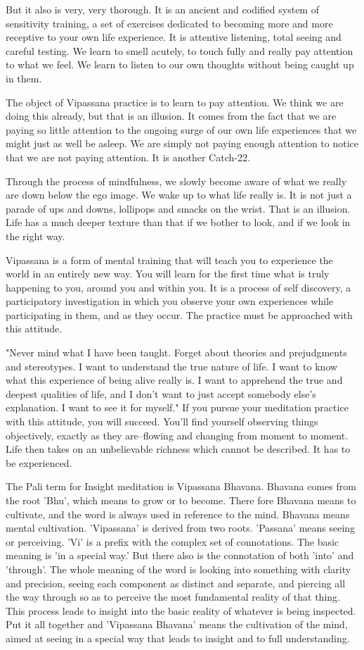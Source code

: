 But it also is very, very thorough. It is an ancient and codified system of
sensitivity training, a set of exercises dedicated to becoming more and more
receptive to your own life experience. It is attentive listening, total seeing
and careful testing. We learn to smell acutely, to touch fully and really pay
attention to what we feel.  We learn to listen to our own thoughts without
being caught up in them.

The object of Vipassana practice is to learn to pay attention. We think we are
doing this already, but that is an illusion. It comes from the fact that we are
paying so little attention to the ongoing surge of our own life experiences that
we might just as well be asleep. We are simply not paying enough attention to
notice that we are not paying attention. It is another Catch-22.

Through the process of mindfulness, we slowly become aware of what we really are
down below the ego image. We wake up to what life really is. It is not just a
parade of ups and downs, lollipops and smacks on the wrist. That is an illusion.
Life has a much deeper texture than that if we bother to look, and if we look in
the right way.

Vipassana is a form of mental training that will teach you to experience the
world in an entirely new way. You will learn for the first time what is truly
happening to you, around you and within you. It is a process of self discovery,
a participatory investigation in which you observe your own experiences while
participating in them, and as they occur. The practice must be approached with
this attitude.

"Never mind what I have been taught. Forget about theories and prejudgments and
stereotypes. I want to understand the true nature of life. I want to know what
this experience of being alive really is. I want to apprehend the true and
deepest qualities of life, and I don't want to just accept somebody else's
explanation. I want to see it for myself." If you pursue your meditation
practice with this attitude, you will succeed. You'll find yourself observing
things objectively, exactly as they are--flowing and changing from moment to
moment. Life then takes on an unbelievable richness which cannot be described.
It has to be experienced.

The Pali term for Insight meditation is Vipassana Bhavana. Bhavana comes from
the root 'Bhu', which means to grow or to become. There fore Bhavana means to
cultivate, and the word is always used in reference to the mind. Bhavana means
mental cultivation. 'Vipassana' is derived from two roots. 'Passana' means
seeing or perceiving. 'Vi' is a prefix with the complex set of connotations. The
basic meaning is 'in a special way.' But there also is the connotation of both
'into' and 'through'. The whole meaning of the word is looking into something
with clarity and precision, seeing each component as distinct and separate, and
piercing all the way through so as to perceive the most fundamental reality of
that thing. This process leads to insight into the basic reality of whatever is
being inspected. Put it all together and 'Vipassana Bhavana' means the
cultivation of the mind, aimed at seeing in a special way that leads to insight
and to full understanding.

